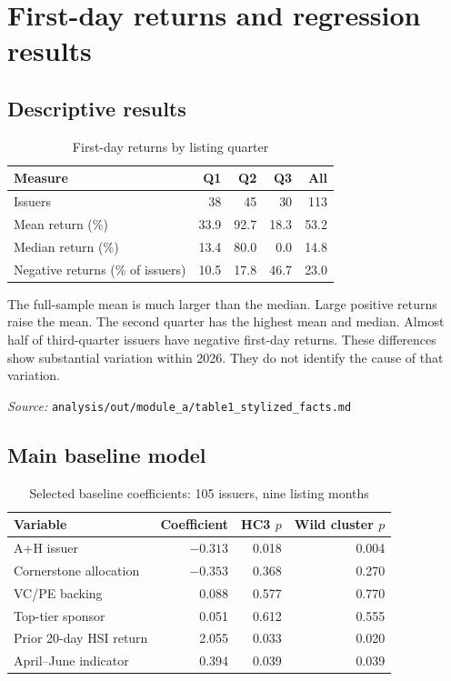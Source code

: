 \documentclass[11pt,a4paper]{article}
\newcommand{\src}[1]{\par{\footnotesize\textit{Source:} \nolinkurl{#1}}}
\begin{document}
\newpage
\section{First-day returns and regression results}
\subsection{Descriptive results}
\begin{table}[h]
\centering
\caption{First-day returns by listing quarter}
\begin{tabular}{lrrrr}
\toprule
Measure & Q1 & Q2 & Q3 & All\\
\midrule
Issuers & 38 & 45 & 30 & 113\\
Mean return (\%) & 33.9 & 92.7 & 18.3 & 53.2\\
Median return (\%) & 13.4 & 80.0 & 0.0 & 14.8\\
Negative returns (\% of issuers) & 10.5 & 17.8 & 46.7 & 23.0\\
\bottomrule
\end{tabular}
\end{table}

The full-sample mean is much larger than the median.
Large positive returns raise the mean.
The second quarter has the highest mean and median.
Almost half of third-quarter issuers have negative first-day returns.
These differences show substantial variation within 2026.
They do not identify the cause of that variation.
\src{analysis/out/module_a/table1_stylized_facts.md}

\subsection{Main baseline model}
\begin{table}[h]
\centering
\caption{Selected baseline coefficients: 105 issuers, nine listing months}
\begin{tabular}{lrrr}
\toprule
Variable & Coefficient & HC3 $p$ & Wild cluster $p$\\
\midrule
A+H issuer & $-0.313$ & 0.018 & 0.004\\
Cornerstone allocation & $-0.353$ & 0.368 & 0.270\\
VC/PE backing & 0.088 & 0.577 & 0.770\\
Top-tier sponsor & 0.051 & 0.612 & 0.555\\
Prior 20-day HSI return & 2.055 & 0.033 & 0.020\\
April--June indicator & 0.394 & 0.039 & 0.039\\
\bottomrule
\end{tabular}
\end{table}
\end{document}
